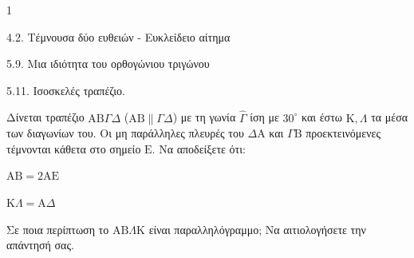 \begin{ylh}{1}
    \item 4.2. Τέμνουσα δύο ευθειών - Ευκλείδειο αίτημα
    \item 5.9. Μια ιδιότητα του ορθογώνιου τριγώνου
    \item 5.11. Ισοσκελές τραπέζιο.
\end{ylh}
Δίνεται τραπέζιο $\mathrm{A}\mathrm{B}\Gamma\Delta$ ($\mathrm{A}\mathrm{B} \parallel \Gamma\Delta$) με τη γωνία $\hat{\Gamma}$ ίση με $30^\circ$ και έστω $\mathrm{K}, \Lambda$ τα μέσα των διαγωνίων του. Οι μη παράλληλες πλευρές του $\Delta\mathrm{A}$ και $\Gamma\mathrm{B}$ προεκτεινόμενες τέμνονται κάθετα στο σημείο $\mathrm{E}$.
Να αποδείξετε ότι:
\begin{alist}
    \item $\mathrm{A}\mathrm{B} = 2\mathrm{A}\mathrm{E}$ 
    \item $\mathrm{K}\Lambda = \mathrm{A}\Delta$ 
    \item Σε ποια περίπτωση το $\mathrm{A}\mathrm{B}\Lambda\mathrm{K}$ είναι παραλληλόγραμμο; Να αιτιολογήσετε την απάντησή σας. 
\end{alist}

